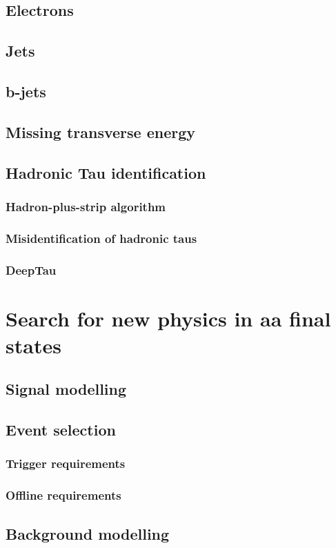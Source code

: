 \documentclass[11pt, a4paper, twoside]{report}
\begin{document}
\section{Electrons}
\section{Jets}
\section{b-jets}
\section{Missing transverse energy}
\section{Hadronic Tau identification}
\subsection{Hadron-plus-strip algorithm}
\subsection{Misidentification of hadronic taus}
\subsection{DeepTau}

\chapter{Search for new physics in aa final states}
\section{Signal modelling}
\section{Event selection}
\subsection{Trigger requirements}
\subsection{Offline requirements}
\section{Background modelling}
\end{document}
